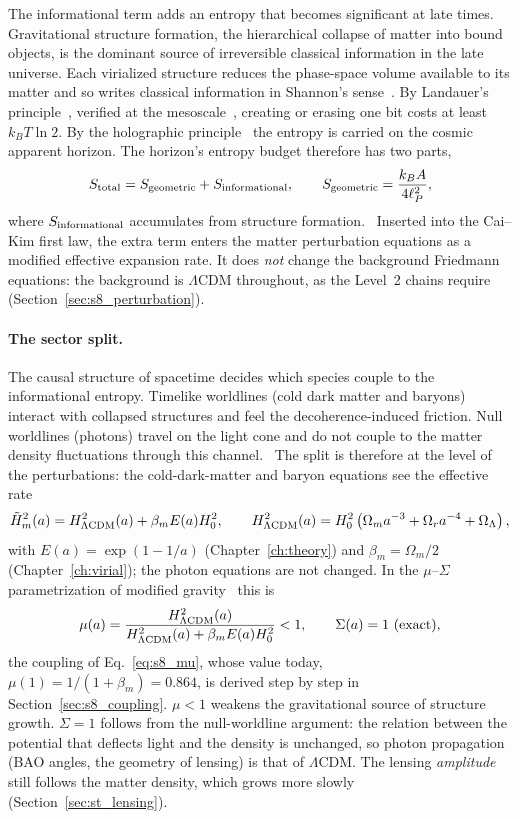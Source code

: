 The informational term adds an entropy that becomes significant at late times. Gravitational structure formation, the hierarchical collapse of matter
into bound objects, is the dominant source of irreversible classical information in the late universe. Each virialized structure reduces the
phase-space volume available to its matter and so writes classical information in Shannon's sense~\cite{Shannon1948}. By Landauer's
principle~\cite{Landauer1961}, verified at the mesoscale~\cite{Berut2012}, creating or erasing one bit costs at least $k_BT\ln2$. By the holographic
principle~\cite{Bousso2002} the entropy is carried on the cosmic apparent horizon. The horizon's entropy budget therefore has two parts,
\begin{equation}
S_{\rm total}=S_{\rm geometric}+S_{\rm informational},\qquad S_{\rm geometric}=\frac{k_BA}{4\ell_P^2},
\label{eq:st_entropy}\end{equation}
where $S_{\rm informational}$ accumulates from structure formation. \interp\ Inserted into the Cai--Kim first law, the extra term enters the matter
perturbation equations as a modified effective expansion rate. It does \emph{not} change the background Friedmann equations: the background is
$\Lambda$CDM throughout, as the Level~2 chains require (Section~\ref{sec:s8_perturbation}).

\paragraph{The sector split.} The causal structure of spacetime decides which species couple to the informational entropy. Timelike worldlines (cold
dark matter and baryons) interact with collapsed structures and feel the decoherence-induced friction. Null worldlines (photons) travel on the light
cone and do not couple to the matter density fluctuations through this channel. \interp\ The split is therefore at the level of the perturbations:
the cold-dark-matter and baryon equations see the effective rate
\begin{equation}
\tilde H_m^2(a)=H^2_{\Lambda\rm CDM}(a)+\beta_mE(a)H_0^2,\qquad H^2_{\Lambda\rm CDM}(a)=H_0^2\left(\Omega_ma^{-3}+\Omega_ra^{-4}+\Omega_\Lambda\right),
\label{eq:st_hm}\end{equation}
with $E(a)=\exp(1-1/a)$ (Chapter~\ref{ch:theory}) and $\beta_m=\Omega_m/2$ (Chapter~\ref{ch:virial}); the photon equations are not changed. In the
$\mu$--$\Sigma$ parametrization of modified gravity~\cite{PogosianSilvestri2016} this is
\begin{equation}
\mu(a)=\frac{H^2_{\Lambda\rm CDM}(a)}{H^2_{\Lambda\rm CDM}(a)+\beta_mE(a)H_0^2}<1,\qquad \Sigma(a)=1\ \text{(exact)},
\label{eq:st_mu}\end{equation}
the coupling of Eq.~\eqref{eq:s8_mu}, whose value today, $\mu(1)=1/(1+\beta_m)=0.864$, is derived step by step in Section~\ref{sec:s8_coupling}.
$\mu<1$ weakens the gravitational source of structure growth. $\Sigma=1$ follows from the null-worldline argument: the relation between the
potential that deflects light and the density is unchanged, so photon propagation (BAO angles, the geometry of lensing) is that of $\Lambda$CDM. The
lensing \emph{amplitude} still follows the matter density, which grows more slowly (Section~\ref{sec:st_lensing}).

